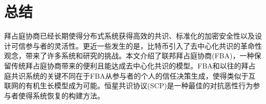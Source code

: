 \section{总结}\label{sec:summary}

拜占庭协商已经长期使得分布式系统获得高效的共识、标准化的加密安全性以及设计可信参与者的灵活性。更近一些发生的是，比特币引入了去中心化共识的革命性观念，带来了许多系统和研究的挑战。本文介绍了联邦拜占庭协商(FBA)，一种保留传统拜占庭协商带来的便利且能达成去中心化共识的模型。FBA和以往的拜占庭共识系统的关键不同在于FBA从参与者的个人的信任决策生成{\quorum}，使得类似于互联网的有机生长模型成为可能。恒星共识协议(SCP)是一种最佳的对抗恶性行为参与者使得系统恢复的构建方法。
